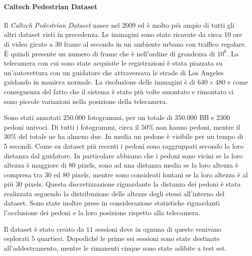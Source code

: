 \paragraph{Caltech Pedestrian Dataset} Il \textit{Caltech Pedestrian Dataset} \cite{dollar2009pedestrian} nasce nel 2009 ed è molto più ampio di tutti gli altri dataset visti in precedenza. Le immagini sono state ricavate da circa 10 ore di video girato a 30 frame al secondo in un ambiente urbano con traffico regolare. È quindi presente un numero di frame che è nell'ordine di grandezza di $10^6$. La telecamera con cui sono state acquisite le registrazioni è stata piazzata su un'autovettura con un guidatore che attraversava le strade di Los Angeles guidando in maniera normale. La risoluzione delle immagini è di $640 \times 480$ e come conseguenza del fatto che il sistema è stato più volte smontato e rimontato ci sono piccole variazioni nella posizione della telecamera. 

Sono stati annotati $250.000$ fotogrammi, per un totale di $350.000$ \ac{BB} e $2300$ pedoni univoci. Di tutti i fotogrammi, circa il $50\%$ non hanno pedoni, mentre il $30\%$ del totale ne ha almeno due. In media un pedone è visibile per un tempo di 5 secondi. Come su dataset più recenti i pedoni sono raggruppati secondo la loro distanza dal guidatore. In particolare abbiamo che i pedoni sono vicini se la loro altezza è maggiore di $80$ pixels, sono ad una distanza media se la loro altezza è compresa tra $30$ ed $80$ pixels, mentre sono consideati lontani se la loro altezza è al più $30$ pixels. Questa discretizzazione riguardante la distanza dei pedoni è stata realizzata seguendo la distribuzione delle altezze degli stessi all'interno del dataset. Sono state inoltre prese in considerazione statistiche riguardanti l'occlusione dei pedoni e la loro posizione rispetto alla telecamera.

Il dataset è stato creato da $11$ sessioni dove in ognuna di queste venivano esplorati $5$ quartieri. Dopodiché le prime sei sessioni sono state destinate all'addestramento, mentre le rimanenti cinque sono state adibite a test set.

